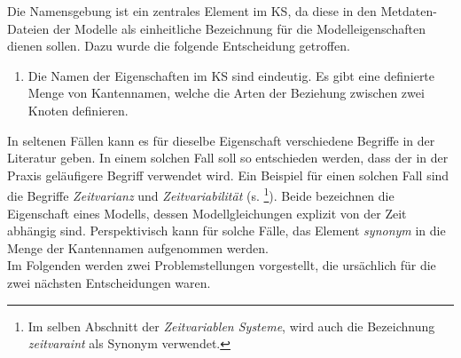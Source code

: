 Die Namensgebung ist ein zentrales Element im KS, da diese in den Metdaten-Dateien der Modelle als einheitliche Bezeichnung für die Modelleigenschaften dienen sollen. Dazu wurde die folgende Entscheidung getroffen.
\begin{enumerate}[resume*]
	\item \label{E.KS_Namensgebung}Die Namen der Eigenschaften im KS sind eindeutig. Es gibt eine definierte Menge von Kantennamen, welche die Arten der Beziehung zwischen zwei Knoten definieren.
\end{enumerate}
In seltenen Fällen kann es für dieselbe Eigenschaft verschiedene Begriffe in der Literatur geben. In einem solchen Fall soll so entschieden werden, dass der in der Praxis geläufigere Begriff verwendet wird. Ein Beispiel für einen solchen Fall sind die Begriffe \textit{Zeitvarianz} und \textit{Zeitvariabilität} (s. \cite[S. 114]{LUN10}\footnote{Im selben Abschnitt der \textit{Zeitvariablen Systeme}, wird auch die Bezeichnung \textit{zeitvaraint} als Synonym verwendet.}). Beide bezeichnen die Eigenschaft eines Modells, dessen Modellgleichungen explizit von der Zeit abhängig sind. Perspektivisch kann für solche Fälle, das Element \textit{synonym} in die Menge der Kantennamen aufgenommen werden.\\
Im Folgenden werden zwei Problemstellungen vorgestellt, die ursächlich für die zwei nächsten Entscheidungen waren.

